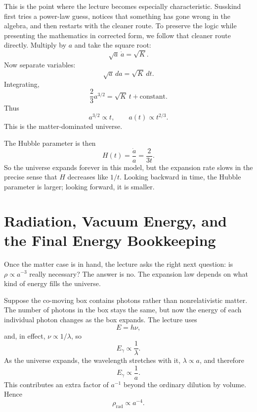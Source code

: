 This is the point where the lecture becomes especially characteristic. Susskind first tries a power-law guess, notices that something has gone wrong in the algebra, and then restarts with the cleaner route. To preserve the logic while presenting the mathematics in corrected form, we follow that cleaner route directly. Multiply by \(a\) and take the square root:
\begin{equation}
\sqrt{a}\,\dot a = \sqrt{K}.
\end{equation}
Now separate variables:
\begin{equation}
\sqrt{a}\,da = \sqrt{K}\,dt.
\end{equation}
Integrating,
\begin{equation}
\frac{2}{3}a^{3/2}=\sqrt{K}\,t+\text{constant}.
\end{equation}
Thus
\begin{equation}
a^{3/2}\propto t,
\qquad
a(t)\propto t^{2/3}.
\end{equation}
This is the matter-dominated universe.

The Hubble parameter is then
\begin{equation}
H(t)=\frac{\dot a}{a}=\frac{2}{3t}.
\end{equation}
So the universe expands forever in this model, but the expansion rate slows in the precise sense that \(H\) decreases like \(1/t\). Looking backward in time, the Hubble parameter is larger; looking forward, it is smaller.

\section{Radiation, Vacuum Energy, and the Final Energy Bookkeeping}

Once the matter case is in hand, the lecture asks the right next question: is \(\rho\propto a^{-3}\) really necessary? The answer is no. The expansion law depends on what kind of energy fills the universe.

Suppose the co-moving box contains photons rather than nonrelativistic matter. The number of photons in the box stays the same, but now the energy of each individual photon changes as the box expands. The lecture uses
\begin{equation}
E=h\nu,
\end{equation}
and, in effect, \(\nu\propto 1/\lambda\), so
\begin{equation}
E_\gamma\propto \frac{1}{\lambda}.
\end{equation}
As the universe expands, the wavelength stretches with it, \(\lambda\propto a\), and therefore
\begin{equation}
E_\gamma\propto \frac{1}{a}.
\end{equation}
This contributes an extra factor of \(a^{-1}\) beyond the ordinary dilution by volume. Hence
\begin{equation}
\rho_{\mathrm{rad}}\propto a^{-4}.
\end{equation}

